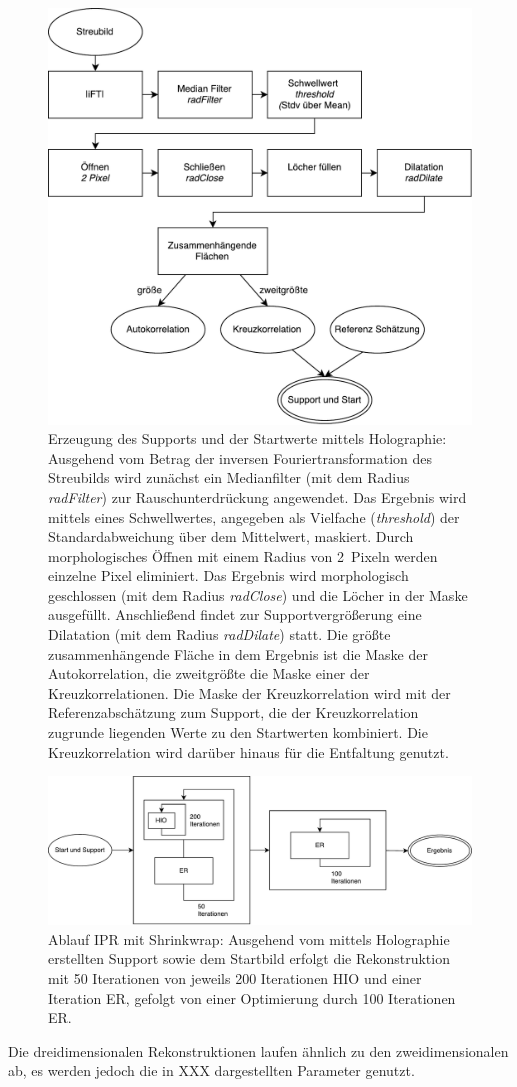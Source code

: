 \begin{figure}
	\centering
	\includegraphics[width=.65\textwidth]{images/flow_holosupport.pdf}
	\caption[Support mittels Holographie]{Erzeugung des Supports und der Startwerte mittels Holographie: Ausgehend vom Betrag der inversen Fouriertransformation des Streubilds wird zunächst ein Medianfilter (mit dem Radius \textit{radFilter}) zur Rauschunterdrückung angewendet. Das Ergebnis wird mittels eines Schwellwertes, angegeben als Vielfache (\textit{threshold}) der Standardabweichung über dem Mittelwert, maskiert. Durch morphologisches Öffnen mit einem Radius von \SI{2}{Pixeln} werden einzelne Pixel eliminiert. Das Ergebnis wird morphologisch geschlossen (mit dem Radius \textit{radClose}) und die Löcher in der Maske ausgefüllt. Anschließend findet zur Supportvergrößerung eine Dilatation (mit dem Radius \textit{radDilate}) statt. Die größte zusammenhängende Fläche in dem Ergebnis ist die Maske der Autokorrelation, die zweitgrößte die Maske einer der Kreuzkorrelationen. Die Maske der Kreuzkorrelation wird mit der Referenzabschätzung zum Support, die der Kreuzkorrelation zugrunde liegenden Werte zu den Startwerten kombiniert. Die Kreuzkorrelation wird darüber hinaus für die Entfaltung genutzt.}
	\label{fig:flow_holosupport}
\end{figure} 

\begin{figure}
	\centering
	\includegraphics[width=.8\textwidth]{images/flow_holo.pdf}
	\caption[Ablauf IPR mit Holographie]{Ablauf IPR mit Shrinkwrap: Ausgehend vom mittels Holographie erstellten Support sowie dem Startbild erfolgt die Rekonstruktion mit 50 Iterationen von jeweils 200 Iterationen HIO und einer Iteration ER, gefolgt von einer Optimierung durch 100 Iterationen ER.}
	\label{fig:flow_holo}
\end{figure} 


Die dreidimensionalen Rekonstruktionen laufen ähnlich zu den zweidimensionalen ab, es werden jedoch die in XXX dargestellten Parameter genutzt. 